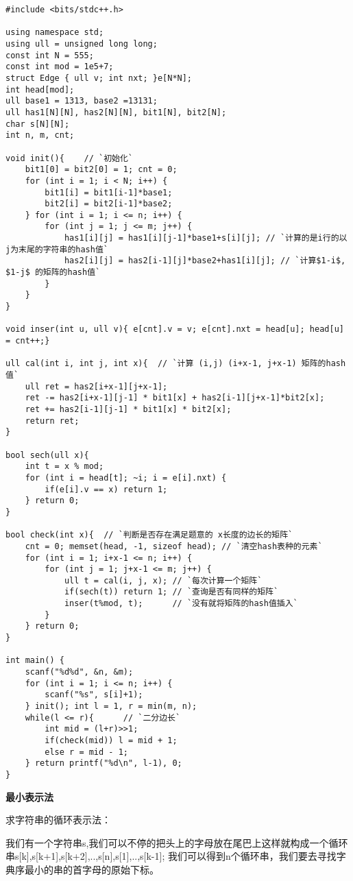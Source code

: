 \begin{lstlisting}
#include <bits/stdc++.h>

using namespace std;
using ull = unsigned long long;
const int N = 555;
const int mod = 1e5+7;
struct Edge { ull v; int nxt; }e[N*N];
int head[mod];
ull base1 = 1313, base2 =13131;
ull has1[N][N], has2[N][N], bit1[N], bit2[N];
char s[N][N];
int n, m, cnt;

void init(){    // `初始化`
    bit1[0] = bit2[0] = 1; cnt = 0;
    for (int i = 1; i < N; i++) {
        bit1[i] = bit1[i-1]*base1;
        bit2[i] = bit2[i-1]*base2;
    } for (int i = 1; i <= n; i++) {
        for (int j = 1; j <= m; j++) {
            has1[i][j] = has1[i][j-1]*base1+s[i][j]; // `计算的是i行的以j为末尾的字符串的hash值`
            has2[i][j] = has2[i-1][j]*base2+has1[i][j]; // `计算$1-i$, $1-j$ 的矩阵的hash值`
        }
    }
}

void inser(int u, ull v){ e[cnt].v = v; e[cnt].nxt = head[u]; head[u] = cnt++;}

ull cal(int i, int j, int x){  // `计算 (i,j) (i+x-1, j+x-1) 矩阵的hash值`
    ull ret = has2[i+x-1][j+x-1];    
    ret -= has2[i+x-1][j-1] * bit1[x] + has2[i-1][j+x-1]*bit2[x];
    ret += has2[i-1][j-1] * bit1[x] * bit2[x];
    return ret;
}

bool sech(ull x){
    int t = x % mod;
    for (int i = head[t]; ~i; i = e[i].nxt) {
        if(e[i].v == x) return 1;
    } return 0;
}

bool check(int x){  // `判断是否存在满足题意的 x长度的边长的矩阵`
    cnt = 0; memset(head, -1, sizeof head); // `清空hash表种的元素`
    for (int i = 1; i+x-1 <= n; i++) {
        for (int j = 1; j+x-1 <= m; j++) {
            ull t = cal(i, j, x); // `每次计算一个矩阵`
            if(sech(t)) return 1; // `查询是否有同样的矩阵`
            inser(t%mod, t);      // `没有就将矩阵的hash值插入`
        }
    } return 0;
}

int main() {
    scanf("%d%d", &n, &m);  
    for (int i = 1; i <= n; i++) {
        scanf("%s", s[i]+1);
    } init(); int l = 1, r = min(m, n); 
    while(l <= r){      // `二分边长`
        int mid = (l+r)>>1;
        if(check(mid)) l = mid + 1;
        else r = mid - 1;
    } return printf("%d\n", l-1), 0;
}
\end{lstlisting}

{\bfseries 最小表示法}

求字符串的循环表示法：

我们有一个字符串s,我们可以不停的把头上的字母放在尾巴上这样就构成一个循环串s[k],s[k+1],s[k+2],..,s[n],s[1],..,s[k-1]; 我们可以得到n个循环串，我们要去寻找字典序最小的串的首字母的原始下标。

